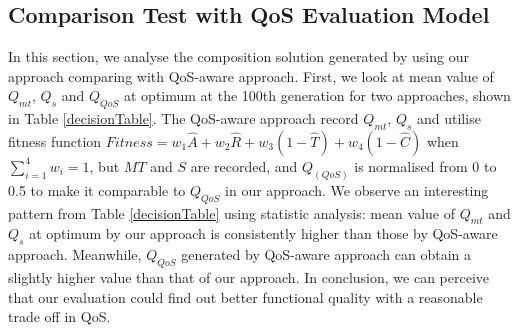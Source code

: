 \documentclass{IEEEtran}
\begin{document}
\subsection{Comparison Test with QoS Evaluation Model}\label{comparisonTest}
In this section, we analyse the composition solution generated by using our approach comparing with QoS-aware approach. First, we look at mean value of $Q_{mt}$, $Q_{s}$ and $Q_{QoS}$ at optimum at the 100th generation for two approaches, shown in Table \ref{decisionTable}. The QoS-aware approach record $Q_{mt}$, $Q_{s}$ and utilise fitness function $Fitness = w_1 \hat{A} + w_2 \hat{R} + w_3(1 - \hat{T}) + w_4(1 - \hat{C})$ when $\sum_{i=1}^{4} w_i = 1$, but $MT$ and $S$ are recorded, and $Q_(QoS)$ is normalised from 0 to 0.5 to make it comparable to $Q_{QoS}$ in our approach. We observe an interesting pattern from Table \ref{decisionTable} using statistic analysis: mean value of $Q_{mt}$ and $Q_{s}$ at optimum by our approach is consistently higher than those by QoS-aware approach.  Meanwhile, $Q_{QoS}$ generated by QoS-aware approach can obtain a slightly higher value than that of our approach. In conclusion, we can perceive that our evaluation could find out better functional quality with a reasonable trade off in QoS.
\end{document}
